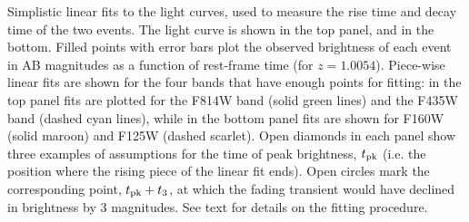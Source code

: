 Simplistic linear fits to the \spock light curves, used to measure the rise time and decay time of the two events.  The \spockone light curve is shown in the top panel, and \spocktwo in the bottom. Filled points with error bars plot the observed brightness of each event in AB magnitudes as a function of rest-frame time (for $z=1.0054$). Piece-wise linear fits are shown for the four bands that have enough points for fitting: in the top panel fits are plotted for the F814W band (solid green lines) and the F435W band (dashed cyan lines), while in the bottom panel fits are shown for F160W (solid maroon) and F125W (dashed scarlet).  Open diamonds in each panel show three examples of assumptions for the time of peak brightness, $t_{\rm pk}$ (i.e. the position where the rising piece of the linear fit ends).  Open circles mark the corresponding point, $t_{\rm pk} + t_3$, at which the fading transient would have declined in brightness by 3 magnitudes.  See text for details on the fitting procedure.
\label{fig:LinearLightCurveFits}